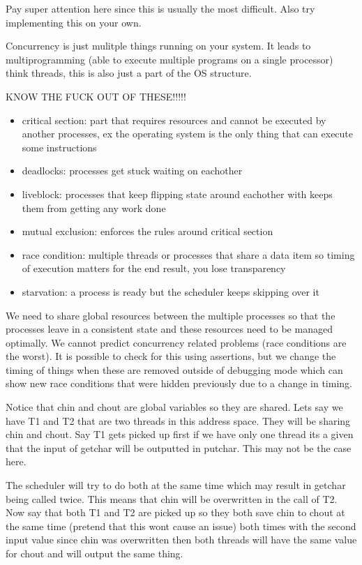 \documentclass[24pt]{article}
\begin{document}
Pay super attention here since this is usually the most difficult. Also try implementing this on your own.


Concurrency is just mulitple things running on your system. It leads to multiprogramming (able to execute multiple programs on a single processor) think threads, this is also just a part of the OS structure.

KNOW THE FUCK OUT OF THESE!!!!!
\begin{itemize}
    \item critical section: part that requires resources and cannot be executed by another processes, ex the operating system is the only thing that can execute some instructions
    \item deadlocks: processes get stuck waiting on eachother
    \item liveblock: processes that keep flipping state around eachother with keeps them from getting any work done
    \item mutual exclusion: enforces the rules around critical section
    \item race condition: multiple threads or processes that share a data item so timing of execution matters for the end result, you lose transparency
    \item starvation: a process is ready but the scheduler keeps skipping over it
\end{itemize}

We need to share global resources between the multiple processes so that the processes leave in a consistent state and these resources need to be managed optimally. We cannot predict concurrency related problems (race conditions are the worst). It is possible to check for this using assertions, but we change the timing of things when these are removed outside of debugging mode which can show new race conditions that were hidden previously due to a change in timing.

Notice that chin and chout are global variables so they are shared. Lets say we have T1 and T2 that are two threads in this address space. They will be sharing chin and chout. Say T1 gets picked up first if we have only one thread its a given that the input of getchar will be outputted in putchar. This may not be the case here.

 The scheduler will try to do both at the same time which may result in getchar being called twice. This means that chin will be overwritten in the call of T2. Now say that both T1 and T2 are picked up so they both save chin to chout at the same time (pretend that this wont cause an issue) both times with the second input value since chin was overwritten then both threads will have the same value for chout and will output the same thing.
\end{document}
